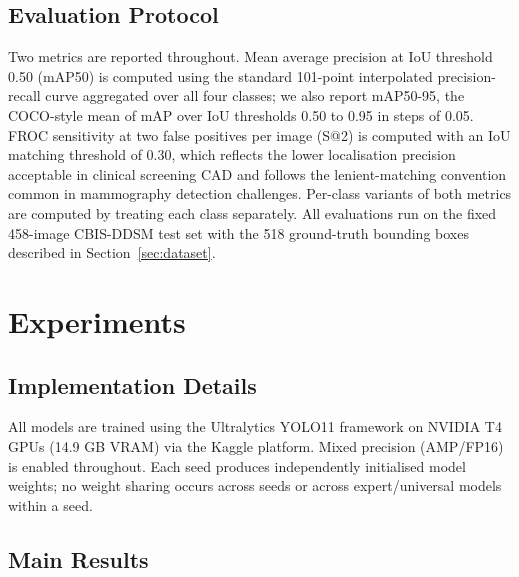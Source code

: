 \documentclass[runningheads]{llncs}
\begin{document}
\subsection{Evaluation Protocol}

Two metrics are reported throughout. Mean average precision at IoU
threshold 0.50 (mAP50) is computed using the standard 101-point
interpolated precision-recall curve aggregated over all four classes;
we also report mAP50-95, the COCO-style mean of mAP over IoU thresholds
0.50 to 0.95 in steps of 0.05. FROC sensitivity at two false positives
per image (S@2) is computed with an IoU matching threshold of 0.30,
which reflects the lower localisation precision acceptable in clinical
screening CAD and follows the lenient-matching convention common in
mammography detection challenges.
Per-class variants of both metrics are computed by treating each class
separately. All evaluations run on the fixed 458-image CBIS-DDSM
test set with the 518 ground-truth bounding boxes described in
Section~\ref{sec:dataset}.

\section{Experiments}
\label{sec:experiments}

\subsection{Implementation Details}

All models are trained using the Ultralytics YOLO11 framework
\cite{jocher2024ultralytics} on NVIDIA T4 GPUs (14.9 GB VRAM) via the
Kaggle platform. Mixed precision (AMP/FP16) is enabled throughout.
Each seed produces independently initialised model weights; no weight
sharing occurs across seeds or across expert/universal models within
a seed.

\subsection{Main Results}
\label{sec:results}
\end{document}
